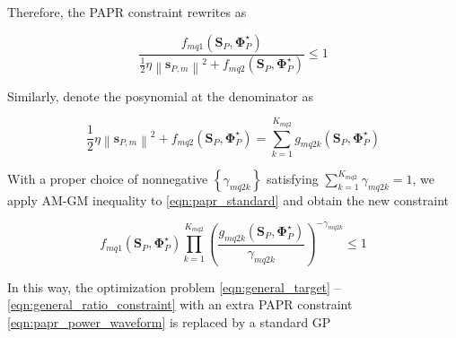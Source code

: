 Therefore, the PAPR constraint rewrites as

\begin{equation}\label{eqn:papr_standard}
  \frac{{{f_{mq1}}\left( {{{\mathbf{S}}_P},{\mathbf{\Phi }}_P^ \star } \right)}}{{\frac{1}{2}\eta {{\left\| {{{\mathbf{s}}_{P,m}}} \right\|}^2} + {f_{mq2}}\left( {{{\mathbf{S}}_P},{\mathbf{\Phi }}_P^ \star } \right)}} \leqslant 1
\end{equation}

Similarly, denote the posynomial at the denominator as

\begin{equation}\label{eqn:papr_denominator}
  \frac{1}{2}\eta {\left\| {{{\mathbf{s}}_{P,m}}} \right\|^2} + {f_{mq2}}\left( {{{\mathbf{S}}_P},{\mathbf{\Phi }}_P^ \star } \right) = \sum\limits_{k = 1}^{{K_{mq2}}} {{g_{mq2k}}} \left( {{{\mathbf{S}}_P},{\mathbf{\Phi }}_P^ \star } \right)
\end{equation}

With a proper choice of nonnegative $\left\{ {{\gamma _{mq2k}}} \right\}$ satisfying $\sum\nolimits_{k = 1}^{{K_{mq2}}} {{\gamma _{mq2k}}}  = 1$, we apply AM-GM inequality to \eqref{eqn:papr_standard} and obtain the new constraint

\begin{equation}\label{eqn:papr_equivalent_inequality}
  {f_{mq1}}\left( {{{\mathbf{S}}_P},{\mathbf{\Phi }}_P^ \star } \right)\prod\limits_{k = 1}^{{K_{mq2}}} {{{\left( {\frac{{{g_{mq2k}}\left( {{{\mathbf{S}}_P},{\mathbf{\Phi }}_P^ \star } \right)}}{{{\gamma _{mq2k}}}}} \right)}^{ - {\gamma _{mq2k}}}}}  \leqslant 1
\end{equation}

In this way, the optimization problem \eqref{eqn:general_target} -- \eqref{eqn:general_ratio_constraint} with an extra PAPR constraint \eqref{eqn:papr_power_waveform} is replaced by a standard GP

